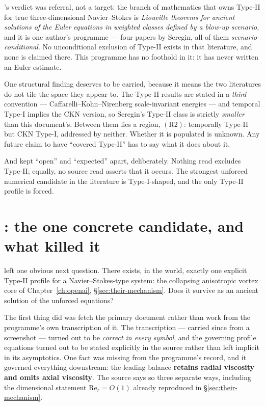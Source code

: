 's verdict was referral, not a target: the branch of mathematics that
owns Type-II for true three-dimensional Navier--Stokes is \emph{Liouville
theorems for ancient solutions of the Euler equations in weighted classes
defined by a blow-up scenario}, and it is one author's programme --- four
papers by Seregin, all of them \emph{scenario-conditional}. No unconditional
exclusion of Type-II exists in that literature, and none is claimed there. This
programme has no foothold in it: it has never written an Euler estimate.

One structural finding deserves to be carried, because it means the two
literatures do not tile the space they appear to. The Type-II results are
stated in a \emph{third} convention --- Caffarelli--Kohn--Nirenberg
scale-invariant energies --- and temporal Type-I implies the CKN version, so
Seregin's Type-II class is strictly \emph{smaller} than this document's. Between
them lies a region, \(\mathrm{(R2)}\): temporally Type-II but CKN Type-I,
addressed by neither. Whether it is populated is unknown. Any future claim to
have ``covered Type-II'' has to say what it does about it.

And  kept ``open'' and ``expected'' apart, deliberately. Nothing read
excludes Type-II; equally, no source read asserts that it occurs. The strongest
unforced numerical candidate in the literature is Type-I-shaped, and the only
Type-II profile is forced.

\section{\texorpdfstring{: the one concrete candidate, and what killed
it}{S54: the one concrete candidate, and what killed it}}
\label{sec:pt-s54}

 left one obvious next question. There exists, in the world, exactly one
explicit Type-II profile for a Navier--Stokes-type system: the collapsing
anisotropic vortex core of Chapter~\ref{ch:openai}, \S\ref{sec:their-mechanism}.
Does it survive as an ancient solution of the unforced equations?

The first thing  did was fetch the primary document rather than work from
the programme's own transcription of it. The transcription --- carried since
 from a screenshot --- turned out to be \emph{correct in every symbol},
and the governing profile equations turned out to be stated explicitly in the
source rather than left implicit in its asymptotics. One fact was missing from
the programme's record, and it governed everything downstream: the leading
balance \textbf{retains radial viscosity and omits axial viscosity}. The source
says so three separate ways, including the dimensional statement
\(\mathrm{Re}_r=O(1)\) already reproduced in \S\ref{sec:their-mechanism}.

